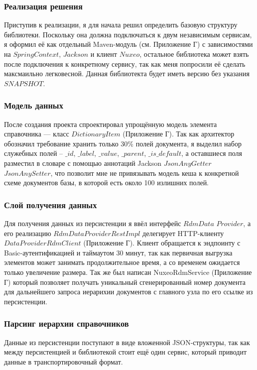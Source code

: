 \subsubsection{Реализация решения}

Приступив к реализации, я для начала решил определить базовую структуру библиотеки.
Поскольку она должна подключаться к двум независимым сервисам,
я оформил её как отдельный Maven-модуль (см. Приложение Г)
с зависимостями на $Spring Context$, $Jackson$ и клиент $Nuxeo$,
остальное библиотека может взять после подключения к конкретному сервису,
так как меня попросили её сделать максмаильно легковесной. 
Данная библиотекта будет иметь версию без указания $SNAPSHOT$.

\subsubsection{Модель данных}
После создания проекта спроектировал упрощённую модель элемента справочника —
класс $DictionaryItem$ (Приложение Г). Так как архитектор обозначил требование хранить только 30\% полей документа,
я выделил набор служебных полей -- $\_id$,
$\_label$, $\_value$, $\_parent$, $\_is\_default$,
а оставшиеся поля разместил в словаре с помощью аннотаций
Jackson $JsonAnyGetter$ $JsonAnySetter$, что позволит мне не 
привязывать модель кеша к конкретной схеме документов базы, в которой есть около 100 излишних полей.

\subsubsection{Слой получения данных}
Для получения данных из персистенции я ввёл интерфейс
$RdmData$ $Provider$, а его реализацию $RdmDataProviderRestImpl$ делегирует HTTP-клиенту
$DataProviderRdmClient$ (Приложение Г).
Клиент обращается к эндпоинту с Basic-аутентификацией
и таймаутом 30 минут, так как первичная выгрузка элементов
может занимать продолжительное время, а со временем ожидается только увеличение размера.
Так же был написан NuxeoRdmService (Приложение Г) который позволяет получать уникальный сгенерированный номер документа для дальнейшего запроса иерарихии документов с главного узла
по его ссылке из персистенции.

\subsubsection{Парсинг иерархии справочников}
Данные из персистенции поступают в виде вложенной JSON-структуры, 
так как между персистенцией и библиотекой стоит ещё один сервис, 
который приводит данные в транспортировочный формат.

